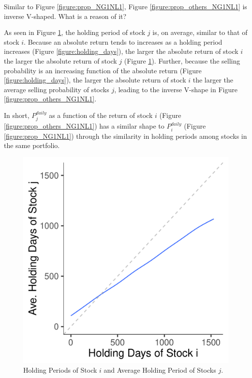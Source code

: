\documentclass[11pt, a4paper]{article}
\begin{document}
Similar to Figure \ref{figure:prop_NG1NL1}, Figure \ref{figure:prop_others_NG1NL1} is inverse V-shaped. What is a reason of it? 

As seen in Figure \ref{figure:holding_days_i_j_NG1NL1}, the holding period of stock $j$ is, on average, similar to that of stock $i$. Because an absolute return tends to increases as a holding period increases (Figure \ref{figure:holding_days}), the larger the absolute return of stock $i$ the larger the absolute return of stock $j$ (Figure \ref{figure:holding_days_i_j_NG1NL1}). Further, because the selling probability is an increasing function of the absolute return (Figure \ref{figure:holding_days}), the larger the absolute return of stock $i$ the larger the average selling probability of stocks $j$, leading to the inverse V-shape in Figure \ref{figure:prop_others_NG1NL1}. 


In short, $P^{daily}_{j}$ as a function of the return of stock $i$ (Figure \ref{figure:prop_others_NG1NL1}) has a similar shape to $P^{daily}_{i}$ (Figure \ref{figure:prop_NG1NL1}) through the similarity in holding periods among stocks in the same portfolio. 

\begin{figure}[H]
	\centering
	\includegraphics[width=0.5\columnwidth]{barc_holding_days_i_j_NG1_NL1.pdf}
	\caption{Holding Periods of Stock $i$ and Average Holding Period of Stocks $j$.}
	\label{figure:holding_days_i_j_NG1NL1}
\end{figure}
\end{document}
